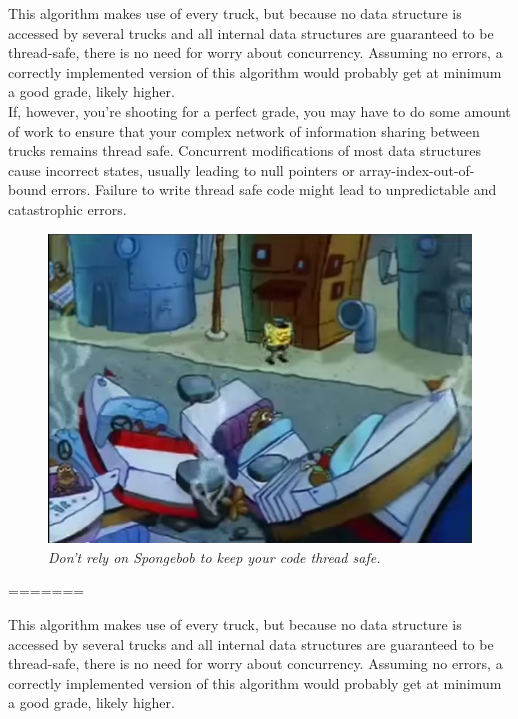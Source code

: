 \documentclass[11pt]{article}
\begin{document}
\begin{itemize}
This algorithm makes use of every truck, but because no data structure is accessed by several trucks and all internal data structures are guaranteed to be thread-safe, there is no need for worry about concurrency. Assuming no errors, a correctly implemented version of this algorithm  would probably get at minimum a good grade, likely higher.\\

If, however, you're shooting for a perfect grade, you may have to do some amount of work to ensure that your complex network of information sharing between trucks remains thread safe. Concurrent modifications of most data structures cause incorrect states, usually leading to null pointers or array-index-out-of-bound errors. Failure to write thread safe code might lead to unpredictable and catastrophic errors.\\
\begin{figure}[h]
\centerline{\includegraphics[scale=0.45]{collision.png}} 
\caption{\em{Don't rely on Spongebob to keep your code thread safe.}}
\end{figure}
=======

This algorithm makes use of every truck, but because no data structure is accessed by several trucks and all internal data structures are guaranteed to be thread-safe, there is no need for worry about concurrency. Assuming no errors, a correctly implemented version of this algorithm  would probably get at minimum a good grade, likely higher.\\


\end{itemize}
\end{document}
